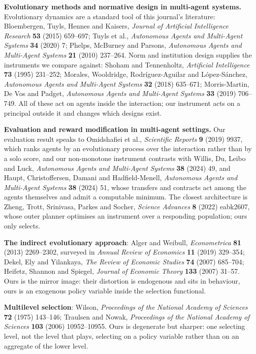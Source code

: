 \documentclass[10pt,a4paper]{article}
\begin{document}
\textbf{Evolutionary methods and normative design in multi-agent systems.}
Evolutionary dynamics are a standard tool of this journal's literature:
Bloembergen, Tuyls, Hennes and Kaisers, \emph{Journal of Artificial
Intelligence Research} \textbf{53} (2015) 659--697; Tuyls et al.,
\emph{Autonomous Agents and Multi-Agent Systems} \textbf{34} (2020) 7; Phelps,
McBurney and Parsons, \emph{Autonomous Agents and Multi-Agent Systems}
\textbf{21} (2010) 237--264. Norm and institution design supplies the
instruments we compare against: Shoham and Tennenholtz, \emph{Artificial
Intelligence} \textbf{73} (1995) 231--252; Morales, Wooldridge,
Rodr\'{i}guez-Aguilar and L\'{o}pez-S\'{a}nchez, \emph{Autonomous Agents and
Multi-Agent Systems} \textbf{32} (2018) 635--671; Morris-Martin, De Vos and
Padget, \emph{Autonomous Agents and Multi-Agent Systems} \textbf{33} (2019)
706--749. All of these act on agents inside the interaction; our instrument
acts on a principal outside it and changes which designs exist.

\textbf{Evaluation and reward modification in multi-agent settings.} Our
evaluation result speaks to Omidshafiei et al., \emph{Scientific Reports}
\textbf{9} (2019) 9937, which ranks agents by an evolutionary process over the
interaction rather than by a solo score, and our non-monotone instrument
contrasts with Willis, Du, Leibo and Luck, \emph{Autonomous Agents and
Multi-Agent Systems} \textbf{38} (2024) 49, and Haupt, Christoffersen, Damani
and Hadfield-Menell, \emph{Autonomous Agents and Multi-Agent Systems}
\textbf{38} (2024) 51, whose transfers and contracts act among the agents
themselves and admit a computable minimum. The closest architecture is Zheng,
Trott, Srinivasa, Parkes and Socher, \emph{Science Advances} \textbf{8} (2022)
eabk2607, whose outer planner optimises an instrument over a responding
population; ours only selects.

\textbf{The indirect evolutionary approach}: Alger and Weibull,
\emph{Econometrica} \textbf{81} (2013) 2269--2302, surveyed in \emph{Annual
Review of Economics} \textbf{11} (2019) 329--354; Dekel, Ely and Yilankaya,
\emph{The Review of Economic Studies} \textbf{74} (2007) 685--704; Heifetz,
Shannon and Spiegel, \emph{Journal of Economic Theory} \textbf{133} (2007)
31--57. Ours is the mirror image: their distortion is endogenous and sits in
behaviour, ours is an exogenous policy variable inside the selection
functional.

\textbf{Multilevel selection}: Wilson, \emph{Proceedings of the National
Academy of Sciences} \textbf{72} (1975) 143--146; Traulsen and Nowak,
\emph{Proceedings of the National Academy of Sciences} \textbf{103} (2006)
10952--10955. Ours is degenerate but sharper: one selecting level, not the
level that plays, selecting on a policy variable rather than on an aggregate of
the lower level.
\end{document}
